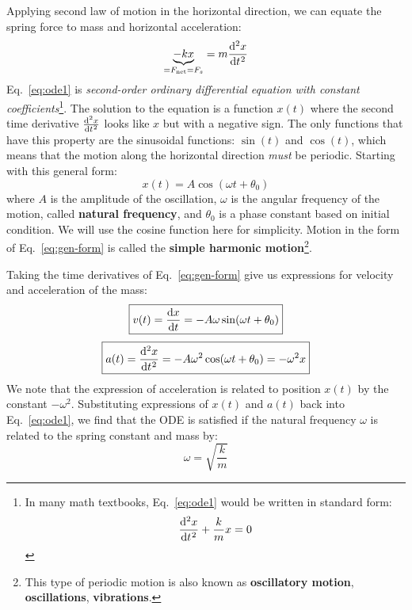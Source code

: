 Applying second law of motion in the horizontal direction, we can equate the
spring force to mass and horizontal acceleration:
\begin{equation}
  \underbrace{-kx}_{=F_\text{net}=F_s} =m\diff[2]xt
  \label{eq:ode1}
\end{equation}
Eq.~\ref{eq:ode1} is
\emph{second-order ordinary differential equation with constant
coefficients}\footnote{In many math textbooks, Eq.~\ref{eq:ode1} would be
written in standard form:
\begin{equation*}
  \diff[2]xt + \frac kmx=0
\end{equation*}
}. The solution to the equation is a function $x(t)$ where the second time
derivative $\diff[2]xt$ looks like $x$ but with a negative sign. The only
functions that have this property are the sinusoidal functions: $\sin(t)$ and
$\cos(t)$, which means that the motion along the horizontal direction
\emph{must} be periodic. Starting with this general form:
\begin{equation}
  \boxed{
    x(t)=A\cos(\omega t+\theta_0)
  }
  \label{eq:gen-form}
\end{equation}
where $A$ is the amplitude of the oscillation, $\omega$ is the angular
frequency of the motion, called \textbf{natural frequency}, and $\theta_0$ is a
phase constant based on initial condition. We will use the cosine function here
for simplicity. Motion in the form of Eq.~\ref{eq:gen-form} is called the
\textbf{simple harmonic motion}\footnote{This type of periodic motion is also
known as \textbf{oscillatory motion}, \textbf{oscillations},
\textbf{vibrations}.}.

Taking the time derivatives of Eq.~\ref{eq:gen-form} give us expressions for
velocity and acceleration of the mass:
\begin{equation}
  \boxed{
    v(t)=\diff xt=-A\omega\sin(\omega t+\theta_0)
  }
\end{equation}
\begin{equation}
  \boxed{
    a(t)=\diff[2] xt=-A\omega^2\cos(\omega t+\theta_0)=-\omega^2x
  }
\end{equation}
We note that the expression of acceleration is related to position $x(t)$ by
the constant $-\omega^2$. Substituting expressions of $x(t)$ and $a(t)$ back
into Eq.~\ref{eq:ode1}, we find that the ODE is satisfied if the natural
frequency $\omega$ is related to the spring constant and mass by:
\begin{equation}
  \boxed{
    \omega=\sqrt{\frac km}
  }
\end{equation}

